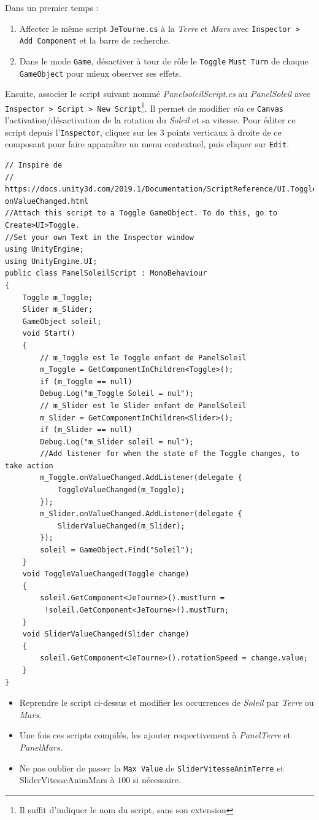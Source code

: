 \documentclass[a4paper,10pt]{article}
\newenvironment{solution}%
{\begin{tcolorbox}[breakable,colback=red!5!white,colframe=red!75!black,title=Solution]}%
{\end{tcolorbox}}
\begin{document}
\ifversionenseignant
\begin{solution}
Dans un premier temps :
\begin{enumerate}
	\item Affecter le même script \lstinline|JeTourne.cs| à la \textit{Terre} et \textit{Mars} avec \texttt{Inspector > Add Component} et la barre de recherche.
	\item Dans le mode \texttt{Game}, désactiver à tour de rôle le \texttt{Toggle} \lstinline|Must Turn| de chaque \lstinline|GameObject| pour mieux observer ses effets.
\end{enumerate}	
	
Ensuite, associer le script suivant nommé \textit{PanelsoleilScript.cs} au \textit{PanelSoleil} avec \texttt{Inspector > Script > New Script}\footnote{Il suffit d'indiquer le nom du script, sans son extension}. Il permet de modifier \textit{via} ce \texttt{Canvas} l'activation/désactivation de la rotation du \textit{Soleil} et sa vitesse. Pour éditer ce script depuis l'\texttt{Inspector}, cliquer sur les 3 points verticaux à droite de ce composant pour faire apparaître un menu contextuel, puis cliquer sur \texttt{Edit}.

\begin{lstlisting}
// Inspire de
// https://docs.unity3d.com/2019.1/Documentation/ScriptReference/UI.Toggle-onValueChanged.html
//Attach this script to a Toggle GameObject. To do this, go to Create>UI>Toggle.
//Set your own Text in the Inspector window
using UnityEngine;
using UnityEngine.UI;
public class PanelSoleilScript : MonoBehaviour
{
	Toggle m_Toggle;
	Slider m_Slider;
	GameObject soleil;
	void Start()
	{
		// m_Toggle est le Toggle enfant de PanelSoleil
		m_Toggle = GetComponentInChildren<Toggle>();
		if (m_Toggle == null)
		Debug.Log("m_Toggle Soleil = nul");
		// m_Slider est le Slider enfant de PanelSoleil
		m_Slider = GetComponentInChildren<Slider>();
		if (m_Slider == null)
		Debug.Log("m_Slider soleil = nul");
		//Add listener for when the state of the Toggle changes, to take action
		m_Toggle.onValueChanged.AddListener(delegate {
			ToggleValueChanged(m_Toggle);
		});
		m_Slider.onValueChanged.AddListener(delegate {
			SliderValueChanged(m_Slider);
		});
		soleil = GameObject.Find("Soleil");
	}
	void ToggleValueChanged(Toggle change)
	{
		soleil.GetComponent<JeTourne>().mustTurn =
		 !soleil.GetComponent<JeTourne>().mustTurn;
	}
	void SliderValueChanged(Slider change)
	{
		soleil.GetComponent<JeTourne>().rotationSpeed = change.value;
	}
}	
\end{lstlisting}

\begin{itemize}
	\item Reprendre le script ci-dessus et modifier les occurrences de \textit{Soleil} par \textit{Terre} ou \textit{Mars}.
	\item Une fois ces scripts compilés, les ajouter respectivement à \textit{PanelTerre} et \textit{PanelMars}.
	\item Ne pas oublier de passer la \texttt{Max Value} de \texttt{SliderVitesseAnimTerre} et SliderVitesseAnimMars à $100$ si nécessaire.
\end{itemize}

\end{solution}
\fi 
\end{document}
